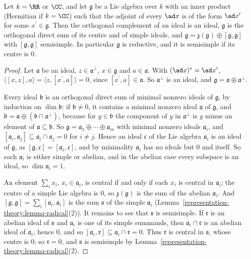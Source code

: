 \begin{proposition}\label{representation-theory:proposition-reductive}
Let $k = \RR$ or $\CC$, and let $\mathfrak{g}$ be a Lie algebra over $k$ with an inner product (Hermitian if $k = \CC$) such that the adjoint of every $\ad x$ is of the form
$\ad x^{\prime}$ for some $x^{\prime} \in \mathfrak{g}$. Then the orthogonal complement of an ideal is an ideal, $\mathfrak{g}$ is the orthogonal direct sum of its centre
and of simple ideals, and $\mathfrak{g} = \mathfrak{z}(\mathfrak{g}) \oplus [\mathfrak{g}, \mathfrak{g}]$ with $[\mathfrak{g}, \mathfrak{g}]$ semisimple. In particular
$\mathfrak{g}$ is reductive, and it is semisimple if its centre is $0$.
\end{proposition}

\begin{proof}
Let $\mathfrak{a}$ be an ideal, $z \in \mathfrak{a}^\perp$, $x \in \mathfrak{g}$ and $a \in \mathfrak{a}$. With $(\ad x)^* = \ad x^{\prime}$,
$\langle[x, z], a\rangle = \langle z, [x^{\prime}, a]\rangle = 0$, since $[x^{\prime}, a] \in \mathfrak{a}$. So $\mathfrak{a}^\perp$ is an ideal, and $\mathfrak{g} = \mathfrak{a}
\oplus \mathfrak{a}^\perp$.

Every ideal $\mathfrak{b}$ is an orthogonal direct sum of minimal nonzero ideals of $\mathfrak{g}$, by induction on $\dim\mathfrak{b}$: if $\mathfrak{b} \neq 0$, it contains a minimal
nonzero ideal $\mathfrak{a}$ of $\mathfrak{g}$, and $\mathfrak{b} = \mathfrak{a} \oplus (\mathfrak{b} \cap \mathfrak{a}^\perp)$, because for $y \in \mathfrak{b}$ the component of
$y$ in $\mathfrak{a}^\perp$ is $y$ minus an element of $\mathfrak{a} \subseteq \mathfrak{b}$. So $\mathfrak{g} = \mathfrak{a}_1 \oplus \cdots \oplus \mathfrak{a}_m$ with minimal
nonzero ideals $\mathfrak{a}_i$, and $[\mathfrak{a}_i, \mathfrak{a}_j] \subseteq \mathfrak{a}_i \cap \mathfrak{a}_j = 0$ for $i \neq j$. Hence an ideal $\mathfrak{c}$ of the Lie
algebra $\mathfrak{a}_i$ is an ideal of $\mathfrak{g}$, as $[\mathfrak{g}, \mathfrak{c}] = [\mathfrak{a}_i, \mathfrak{c}]$, and by minimality $\mathfrak{a}_i$ has no ideals but
$0$ and itself. So each $\mathfrak{a}_i$ is either simple or abelian, and in the abelian case every subspace is an ideal, so $\dim\mathfrak{a}_i = 1$.

An element $\sum_ix_i$, $x_i \in \mathfrak{a}_i$, is central if and only if each $x_i$ is central in $\mathfrak{a}_i$; the centre of a simple Lie algebra is $0$, so
$\mathfrak{z}(\mathfrak{g})$ is the sum of the abelian $\mathfrak{a}_i$. And $[\mathfrak{g}, \mathfrak{g}] = \sum_i[\mathfrak{a}_i, \mathfrak{a}_i]$ is the sum $\mathfrak{s}$ of the
simple $\mathfrak{a}_i$ (Lemma~\ref{representation-theory:lemma-radical}(2)). It remains to see that $\mathfrak{s}$ is semisimple. If $\mathfrak{r}$ is an abelian ideal of
$\mathfrak{s}$ and $\mathfrak{a}_i$ is one of its simple summands, then $\mathfrak{a}_i \cap \mathfrak{r}$ is an abelian ideal of $\mathfrak{a}_i$, hence $0$, and so
$[\mathfrak{a}_i, \mathfrak{r}] \subseteq \mathfrak{a}_i \cap \mathfrak{r} = 0$. Thus $\mathfrak{r}$ is central in $\mathfrak{s}$, whose centre is $0$; so $\mathfrak{r} = 0$, and
$\mathfrak{s}$ is semisimple by Lemma~\ref{representation-theory:lemma-radical}(2).
\end{proof}

